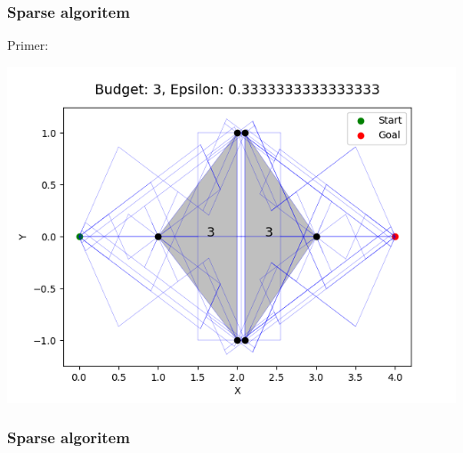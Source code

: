 \documentclass{beamer}
\begin{document}
\begin{frame}
    \frametitle{Sparse algoritem}
    
    Primer:

    \includegraphics[width=1\textwidth]{sparseGraph.png}

\end{frame}

\begin{frame}
    \frametitle{Sparse algoritem}
    


\end{frame}
\end{document}
